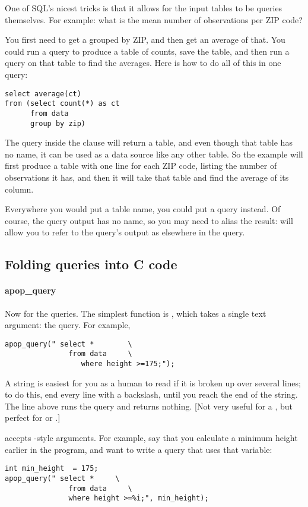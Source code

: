 One of SQL's nicest tricks is that it allows for the input tables to be
queries themselves. For example: what is the mean number of observations per
ZIP code?

You first need to get a  grouped by ZIP, and then get an
average of that. You could run a query to produce a table of counts,
save the table, and then run a query on that table to find the averages.
Here is how to do all of this in one query: 
\begin{lstlisting}
select average(ct) 
from (select count(*) as ct
      from data
      group by zip)
\end{lstlisting}
The query inside the  clause will return a table, and even
though that table has no name, it can be used as a data source like any other
table. So the example will first produce a table with one line for each
ZIP code, listing the number of observations it has, and then it will
take that table and find the average of its  column.

Everywhere you would put a table name, you could put a query 
instead. Of course, the query output has no name, so you may need to
alias the result:  will allow you to refer to
the query's output as  elsewhere in the query.

\subsection{Folding queries into C code} 


\paragraph{apop\_query} Now for the queries. The simplest function
is , which takes a single text argument: the
query. For example,
\setc
\begin{lstlisting}
apop_query(" select *        \
               from data     \
                  where height >=175;");
\end{lstlisting}

A string is easiest for you as a human to read if it is
broken up over several lines; to do this, end every line with a
backslash, until you reach the end of the string. The line above runs
the query and returns nothing. [Not very useful for a , but perfect for
\sinline{create} or \sinline{insert}.]

 accepts -style arguments. For example,
say that you calculate a minimum height earlier in the program, and want
to write a query that uses that variable:
\begin{lstlisting}
int min_height	= 175;
apop_query(" select *     \
               from data     \
               where height >=%i;", min_height);
\end{lstlisting}

